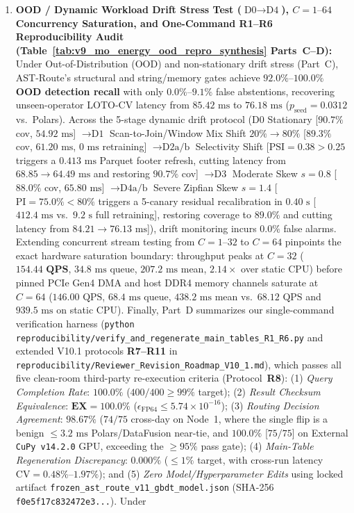 \documentclass[10pt,a4paper]{article}
\begin{document}
\begin{enumerate}[leftmargin=1.5em,itemsep=0.8pt]
    \item \textbf{OOD / Dynamic Workload Drift Stress Test ($\text{D0}\rightarrow\text{D4}$), $C=1\text{--}64$ Concurrency Saturation, and One-Command R1--R6 Reproducibility Audit (Table~\ref{tab:v9_mo_energy_ood_repro_synthesis} Parts~C--D):} Under Out-of-Distribution (OOD) and non-stationary drift stress (Part~C), AST-Route's structural and string/memory gates achieve $\mathbf{92.0\%\text{--}100.0\%}$ \textbf{OOD detection recall} with only $0.0\%\text{--}9.1\%$ false abstentions, recovering unseen-operator LOTO-CV latency from $85.42\text{ ms}$ to $76.18\text{ ms}$ ($p_{\text{seed}}=0.0312$ vs.\ Polars). Across the 5-stage dynamic drift protocol ($\text{D0}$ Stationary [$90.7\%$ cov, $54.92\text{ ms}$] $\rightarrow \text{D1}$ Scan-to-Join/Window Mix Shift $20\%\rightarrow 80\%$ [$89.3\%$ cov, $61.20\text{ ms}$, $0\text{ ms}$ retraining] $\rightarrow \text{D2a/b}$ Selectivity Shift [$\text{PSI}=0.38>0.25$ triggers a $0.413\text{ ms}$ Parquet footer refresh, cutting latency from $68.85\rightarrow 64.49\text{ ms}$ and restoring $90.7\%$ cov] $\rightarrow \text{D3}$ Moderate Skew $s=0.8$ [$88.0\%$ cov, $65.80\text{ ms}$] $\rightarrow \text{D4a/b}$ Severe Zipfian Skew $s=1.4$ [$\text{PI}=75.0\% < 80\%$ triggers a 5-canary residual recalibration in $0.40\text{ s}$ [$412.4\text{ ms}$ vs.\ $9.2\text{ s}$ full retraining], restoring coverage to $89.0\%$ and cutting latency from $84.21\rightarrow 76.13\text{ ms}$]), drift monitoring incurs $0.0\%$ false alarms. Extending concurrent stream testing from $C=1\text{--}32$ to $C=64$ pinpoints the exact hardware saturation boundary: throughput peaks at $C=32$ ($\mathbf{154.44\text{ QPS}}$, $34.8\text{ ms}$ queue, $207.2\text{ ms}$ mean, $2.14\times$ over static CPU) before pinned PCIe Gen4 DMA and host DDR4 memory channels saturate at $C=64$ ($146.00\text{ QPS}$, $68.4\text{ ms}$ queue, $438.2\text{ ms}$ mean vs.\ $68.12\text{ QPS}$ and $939.5\text{ ms}$ on static CPU). Finally, Part~D summarizes our single-command verification harness (\texttt{python reproducibility/verify\_\allowbreak{}and\_\allowbreak{}regenerate\_\allowbreak{}main\_\allowbreak{}tables\_\allowbreak{}R1\_\allowbreak{}R6.py} and extended V10.1 protocols \textbf{R7--R11} in \texttt{reproducibility/Reviewer\_\allowbreak{}Revision\_\allowbreak{}Roadmap\_\allowbreak{}V10\_1.md}), which passes all five clean-room third-party re-execution criteria (Protocol~\textbf{R8}): (1) \emph{Query Completion Rate}: $\mathbf{100.0\%}$ ($400/400 \ge 99\%$ target); (2) \emph{Result Checksum Equivalence}: $\mathbf{\text{EX}=100.0\%}$ ($\epsilon_{\text{FP64}}\le 5.74\times 10^{-16}$); (3) \emph{Routing Decision Agreement}: $\mathbf{98.67\%}$ ($74/75$ cross-day on Node~1, where the single flip is a benign $\le 3.2\text{ ms}$ Polars/DataFusion near-tie, and $\mathbf{100.0\%}$ [$75/75$] on External \texttt{CuPy v14.2.0} GPU, exceeding the $\ge 95\%$ pass gate); (4) \emph{Main-Table Regeneration Discrepancy}: $\mathbf{0.000\%}$ ($\le 1\%$ target, with cross-run latency $\text{CV}=0.48\%\text{--}1.97\%$); and (5) \emph{Zero Model/Hyperparameter Edits} using locked artifact \texttt{frozen\_ast\_route\_v11\_gbdt\_model.json} (SHA-256 \texttt{f0e5f17c832472e3...}). Under 
\end{enumerate}
\end{document}
